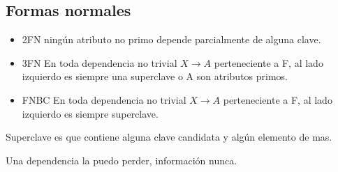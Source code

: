 \subsection*{Formas normales}
\begin{itemize}
\item 2FN ningún atributo no primo depende parcialmente de alguna clave.
\item 3FN En toda dependencia no trivial $X \rightarrow A$ perteneciente a F, al lado izquierdo es siempre una superclave o A son atributos primos.
\item FNBC En toda dependencia no trivial $X \rightarrow A$ perteneciente a F, al lado izquierdo es siempre superclave.
\end{itemize}


Superclave es que contiene alguna clave candidata y algún elemento de mas.

Una dependencia la puedo perder, información nunca.
